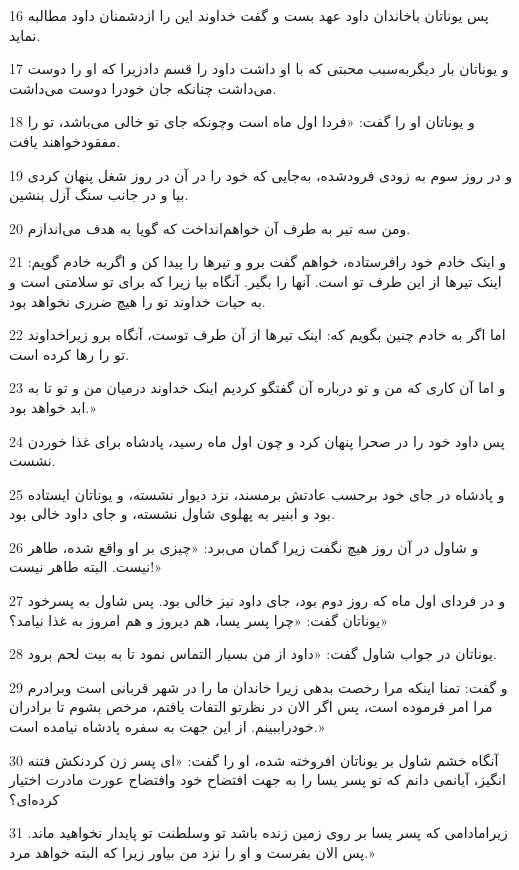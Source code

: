 \par 16 پس یوناتان باخاندان داود عهد بست و گفت خداوند این را ازدشمنان داود مطالبه نماید.
\par 17 و یوناتان بار دیگربه‌سبب محبتی که با او داشت داود را قسم دادزیرا که او را دوست می‌داشت چنانکه جان خودرا دوست می‌داشت.
\par 18 و یوناتان او را گفت: «فردا اول ماه است وچونکه جای تو خالی می‌باشد، تو را مفقودخواهند یافت.
\par 19 و در روز سوم به زودی فرودشده، به‌جایی که خود را در آن در روز شغل پنهان کردی بیا و در جانب سنگ آزل بنشین.
\par 20 ومن سه تیر به طرف آن خواهم‌انداخت که گویا به هدف می‌اندازم.
\par 21 و اینک خادم خود رافرستاده، خواهم گفت برو و تیرها را پیدا کن و اگربه خادم گویم: اینک تیرها از این طرف تو است. آنها را بگیر. آنگاه بیا زیرا که برای تو سلامتی است و به حیات خداوند تو را هیچ ضرری نخواهد بود.
\par 22 اما اگر به خادم چنین بگویم که: اینک تیرها از آن طرف توست، آنگاه برو زیراخداوند تو را رها کرده است.
\par 23 و اما آن کاری که من و تو درباره آن گفتگو کردیم اینک خداوند درمیان من و تو تا به ابد خواهد بود.»
\par 24 پس داود خود را در صحرا پنهان کرد و چون اول ماه رسید، پادشاه برای غذا خوردن نشست.
\par 25 و پادشاه در جای خود بر‌حسب عادتش برمسند، نزد دیوار نشسته، و یوناتان ایستاده بود و ابنیر به پهلوی شاول نشسته، و جای داود خالی بود.
\par 26 و شاول در آن روز هیچ نگفت زیرا گمان می‌برد: «چیزی بر او واقع شده، طاهر نیست. البته طاهر نیست!»
\par 27 و در فردای اول ماه که روز دوم بود، جای داود نیز خالی بود. پس شاول به پسرخود یوناتان گفت: «چرا پسر یسا، هم دیروز و هم امروز به غذا نیامد؟»
\par 28 یوناتان در جواب شاول گفت: «داود از من بسیار التماس نمود تا به بیت لحم برود.
\par 29 و گفت: تمنا اینکه مرا رخصت بدهی زیرا خاندان ما را در شهر قربانی است وبرادرم مرا امر فرموده است، پس اگر الان در نظرتو التفات یافتم، مرخص بشوم تا برادران خودراببینم. از این جهت به سفره پادشاه نیامده است.»
\par 30 آنگاه خشم شاول بر یوناتان افروخته شده، او را گفت: «ای پسر زن کردنکش فتنه انگیز، آیانمی دانم که تو پسر یسا را به جهت افتضاح خود وافتضاح عورت مادرت اختیار کرده‌ای؟
\par 31 زیرامادامی که پسر یسا بر روی زمین زنده باشد تو وسلطنت تو پایدار نخواهید ماند. پس الان بفرست و او را نزد من بیاور زیرا که البته خواهد مرد.»
